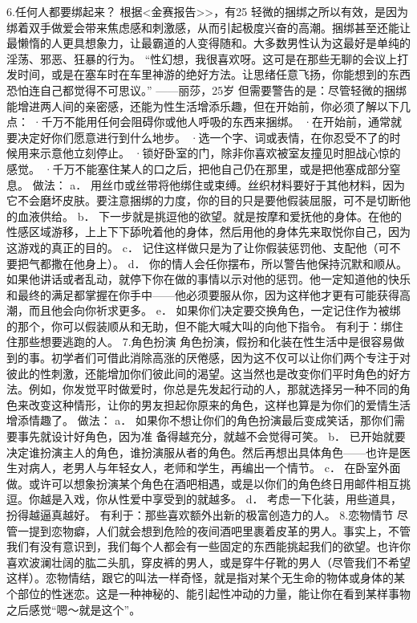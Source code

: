 \documentclass[12pt,UTF8,openany]{ctexbook}
\begin{document}
6.任何人都要绑起来？
根据<金赛报告>>，有25%
轻微的捆绑之所以有效，是因为绑着双手做爱会带来焦虑感和刺激感，从而引起极度兴奋的高潮。捆绑甚至还能让最懒惰的人更具想象力，让最霸道的人变得随和。大多数男性认为这最好是单纯的淫荡、邪恶、狂暴的行为。
“性幻想，我很喜欢呀。这可是在那些无聊的会议上打发时间，或是在塞车时在车里神游的绝好方法。让思绪任意飞扬，你能想到的东西恐怕连自己都觉得不可思议。”
——丽莎，25岁
但需要警告的是：尽管轻微的捆绑能增进两人间的亲密感，还能为性生活增添乐趣，但在开始前，你必须了解以下几点：
·千万不能用任何会阻碍你或他人呼吸的东西来捆绑。
·在开始前，通常就要决定好你们愿意进行到什么地步。
·选一个字、词或表情，在你忍受不了的时候用来示意他立刻停止。
·锁好卧室的门，除非你喜欢被室友撞见时胆战心惊的感觉。
·千万不能塞住某人的口之后，把他自己仍在那里，或是把他塞成部分窒息。
做法：
a． 用丝巾或丝带将他绑住或束缚。丝织材料要好于其他材料，因为它不会磨坏皮肤。要注意捆绑的力度，你的目的只是要他假装屈服，可不是切断他的血液供给。
b． 下一步就是挑逗他的欲望。就是按摩和爱抚他的身体。在他的性感区域游移，上上下下舔吮着他的身体，然后用他的身体先来取悦你自己，因为这游戏的真正的目的。
c． 记住这样做只是为了让你假装惩罚他、支配他（可不要把气都撒在他身上）。
d． 你的情人会任你摆布，所以警告他保持沉默和顺从。如果他讲话或者乱动，就停下你在做的事情以示对他的惩罚。他一定知道他的快乐和最终的满足都掌握在你手中——他必须要服从你，因为这样他才更有可能获得高潮，而且他会向你祈求更多。
e． 如果你们决定要交换角色，一定记住作为被绑的那个，你可以假装顺从和无助，但不能大喊大叫的向他下指令。
有利于：绑住住那些想要逃跑的人。
7.角色扮演
角色扮演，假扮和化装在性生活中是很容易做到的事。初学者们可借此消除高涨的厌倦感，因为这不仅可以让你们两个专注于对彼此的性刺激，还能增加你们彼此间的渴望。这当然也是改变你们平时角色的好方法。例如，你发觉平时做爱时，你总是先发起行动的人，那就选择另一种不同的角色来改变这种情形，让你的男友担起你原来的角色，这样也算是为你们的爱情生活增添情趣了。
做法：
a． 如果你不想让你们的角色扮演最后变成笑话，那你们需要事先就设计好角色，因为准 备得越充分，就越不会觉得可笑。
b． 已开始就要决定谁扮演主人的角色，谁扮演服从者的角色。然后再想出具体角色——也许是医生对病人，老男人与年轻女人，老师和学生，再编出一个情节。
c． 在卧室外面做。或许可以想象扮演某个角色在酒吧相遇，或是以你们的角色终日用邮件相互挑逗。你越是入戏，你从性爱中享受到的就越多。
d． 考虑一下化装，用些道具，扮得越逼真越好。
有利于：那些喜欢额外出新的极富创造力的人。
8.恋物情节
尽管一提到恋物癖，人们就会想到危险的夜间酒吧里裹着皮革的男人。事实上，不管我们有没有意识到，我们每个人都会有一些固定的东西能挑起我们的欲望。也许你喜欢波澜壮阔的肱二头肌，穿皮裤的男人，或是穿牛仔靴的男人（尽管我们不希望这样）。恋物情结，跟它的叫法一样奇怪，就是指对某个无生命的物体或身体的某个部位的性迷恋。这是一种神秘的、能引起性冲动的力量，能让你在看到某样事物之后感觉“嗯～就是这个”。
\end{document}
